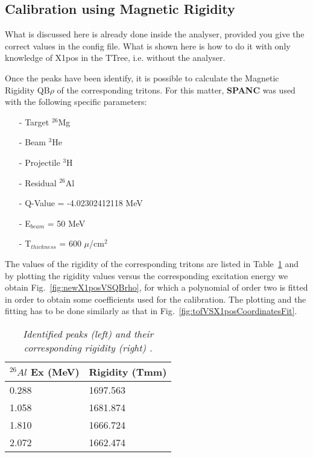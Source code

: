 \documentclass[11pt]{report}
\begin{document}
\subsection{Calibration using Magnetic Rigidity}

What is discussed here is already done inside the analyser, provided you give the 
correct values in the config file. 
What is shown here is how to do it with only knowledge of X1pos in the TTree,
i.e. without the analyser.


Once the peaks have been identify, it is possible to calculate the 
Magnetic Rigidity QB$\rho$ of the corresponding tritons. For this matter, \textbf{SPANC} was
used with the following specific parameters:
{\footnotesize
\begin{itemize}
 \setlength\itemsep{0.001em}
\item[-] Target $^{26}$Mg
\item[-] Beam $^{3}$He
\item[-] Projectile $^{3}$H
\item[-] Residual $^{26}$Al
\item[-] Q-Value = -4.02302412118 MeV
\item[-] E$_{beam}$ = 50 MeV
\item[-] T$_{thickness}$ = 600 $\mu$/cm$^{2}$
\end{itemize}
}

\noindent
The values of the rigidity of the corresponding tritons are listed in 
Table~\ref{tab:rigidity} and by plotting the rigidity values versus the corresponding excitation 
energy we obtain Fig.~\ref{fig:newX1posVSQBrho}, for which a polynomial 
of order two is fitted in order to obtain some coefficients used for the calibration. The plotting
and the fitting has to be done similarly as that in Fig.~\ref{fig:tofVSX1posCoordinatesFit}.

\begin{table}[!th]
\centering
\begin{tabular}{|l|l|}
\hline
$^{26}Al$ Ex (MeV)&Rigidity (Tmm)\\
\hline
0.288&1697.563\\
1.058&1681.874\\
1.810&1666.724\\
2.072&1662.474\\
\hline
\end{tabular}
\caption{\it Identified peaks (left) and their corresponding rigidity (right) \cite{nndc}.}
\label{tab:rigidity}
\end{table}
\end{document}
